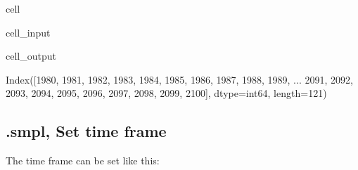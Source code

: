 \documentclass[letterpaper,10pt,english]{jupyterBook}
\begin{document}
\begin{sphinxuseclass}{cell}\begin{sphinxVerbatimInput}

\begin{sphinxuseclass}{cell_input}
\begin{sphinxVerbatim}[commandchars=\\\{\}]
  
\end{sphinxVerbatim}

\end{sphinxuseclass}\end{sphinxVerbatimInput}
\begin{sphinxVerbatimOutput}

\begin{sphinxuseclass}{cell_output}
\begin{sphinxVerbatim}[commandchars=\\\{\}]
Index([1980, 1981, 1982, 1983, 1984, 1985, 1986, 1987, 1988, 1989,
       ...
       2091, 2092, 2093, 2094, 2095, 2096, 2097, 2098, 2099, 2100],
      dtype=\PYGZsq{}int64\PYGZsq{}, length=121)
\end{sphinxVerbatim}

\end{sphinxuseclass}\end{sphinxVerbatimOutput}

\end{sphinxuseclass}

\subsection{.smpl, Set time frame}
\label{\detokenize{content/notebooks/modelflow_features:smpl-set-time-frame}}
\sphinxAtStartPar
The time frame can be set like this:
\end{document}
